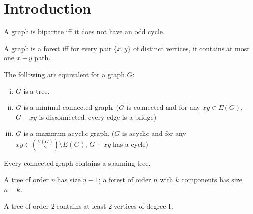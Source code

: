 \section{Introduction}

\begin{definition}
\end{definition}

\begin{ftheo}
A graph is bipartite iff it does not have an odd cycle.
\end{ftheo}

\begin{theorem}
A graph is a forest iff for every pair $\{x,y\}$ of distinct vertices, it contains at most one $x-y$ path.
\end{theorem}

\begin{theorem}
\label{tree equivalences}
The following are equivalent for a graph $G$:
\begin{enumerate}[(i)]
    \item $G$ is a tree.
    \item $G$ is a minimal connected graph. ($G$ is connected and for any $xy\in E(G)$, $G-xy$ is disconnected, every edge is a bridge)
    \item $G$ is a maximum acyclic graph. ($G$ is acyclic and for any $xy\in \binom{V(G)}{2}\setminus E(G)$, $G+xy$ has a cycle)
\end{enumerate}
\end{theorem}

\begin{corollary}
Every connected graph contains a spanning tree.
\end{corollary}

\begin{corollary}
\label{size of forest}
A tree of order $n$ has size $n-1$; a forest of order $n$ with $k$ components has size $n-k$.
\end{corollary}

\begin{corollary}
A tree of order $2$ contains at least $2$ vertices of degree $1$.
\end{corollary}

